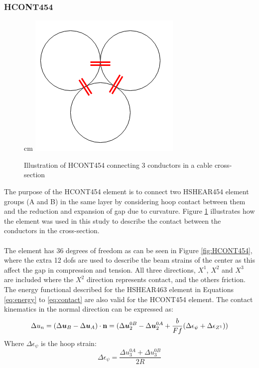 \subsubsection{HCONT454}
\begin{figure}
     cm 
    \centering
   \includegraphics[scale=0.7]{figures/HCONT4541}
\caption[$\; \:$Illustration of HCONT454]{Illustration of HCONT454 connecting 3 conductors in a cable cross-section}
 \label{fig:HCONT4541}
\end{figure}
The purpose of the HCONT454 element is to connect two HSHEAR454 element groups (A and B) in the same layer by considering hoop contact between them and the reduction and expansion of gap due to curvature. Figure \ref{fig:HCONT4541} illustrates how the element was used in this study to describe the contact between the conductors in the cross-section.\\\\The element has 36 degrees of freedom as can be seen in Figure \ref{fig:HCONT454},  where the extra 12 dofs are used to describe the beam strains of the center as this affect the gap in compression and tension. All three directions, $X^1$, $X^2$ and $X^3$ are included where the $X^2$ direction represents contact, and the others friction. The energy functional described for the HSHEAR463 element in Equations \ref{eq:energy} to \ref{eq:contact} are also valid for the HCONT454 element. The contact kinematics in the normal direction can be expressed as: 
\begin{equation}
    \Delta u_n=(\Delta \boldsymbol{u}_B-\Delta \boldsymbol{u}_A) \cdot \bold{n}=(\Delta \boldsymbol{u}_2^{0B}-\Delta \boldsymbol{u}_2^{0A}+\frac{b}{Ff}(\Delta \epsilon_\psi+\Delta \epsilon_{Z^1}))
\end{equation}
\noindent Where $ \Delta \epsilon_\psi$ is the hoop strain:
\begin{equation}
    \Delta \epsilon_\psi =\frac{\Delta u_3^{0A} + \Delta u_3^{0B}}{2R}
\end{equation}
